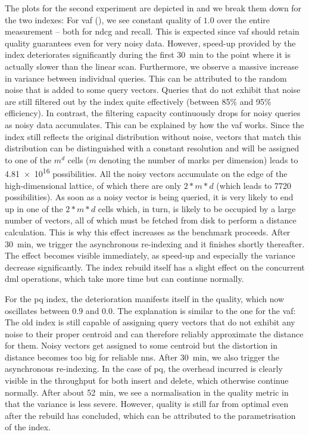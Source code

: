 The plots for the second experiment are depicted in  and we break them down for the two indexes: For \acrshort{vaf} (), we see constant quality of $1.0$ over the entire measurement -- both for \acrshort{ndcg} and recall. This is expected since \acrshort{vaf} should retain quality guarantees even for very noisy data. However, speed-up provided by the index deteriorates significantly during the first \SI{30}{\minute} to the point where it is actually slower than the linear scan. Furthermore, we observe a massive increase in variance between individual queries. This can be attributed to the random noise that is added to some query vectors. Queries that do not exhibit that noise are still filtered out by the index quite effectively (between 85\% and 95\% efficiency). In contrast, the filtering capacity continuously drops for noisy queries as noisy data accumulates. This can be explained by how the \acrshort{vaf} works. Since the index still reflects the original distribution without noise, vectors that match this distribution can be distinguished with a constant resolution and will be assigned to one of the $m^d$ cells ($m$ denoting the number of marks per dimension) leads to \SI{4.81e16}{} possibilities. All the noisy vectors accumulate on the edge of the high-dimensional lattice, of which there are only $2 * m * d$ (which leads to \SI{7720}{} possibilities). As soon as a noisy vector is being queried, it is very likely to end up in one of the $2 * m * d$ cells which, in turn, is likely to be occupied by a large number of vectors, all of which must be fetched from disk to perform a distance calculation. This is why this effect increases as the benchmark proceeds. After \SI{30}{\minute}, we trigger the asynchronous re-indexing and it finishes shortly thereafter. The effect becomes visible immediately, as speed-up and especially the variance decrease significantly. The index rebuild itself has a slight effect on the concurrent \acrshort{dml} operations, which take more time but can continue normally.

For the \acrshort{pq} index, the deterioration manifests itself in the quality, which now oscillates between $0.9$ and $0.0$. The explanation is similar to the one for the \acrshort{vaf}: The old index is still capable of assigning query vectors that do not exhibit any noise to their proper centroid and can therefore reliably approximate the distance for them. Noisy vectors get assigned to some centroid but the distortion in distance becomes too big for reliable \acrshort{nns}. After \SI{30}{\minute}, we also trigger the asynchronous re-indexing. In the case of \acrshort{pq}, the overhead incurred is clearly visible in the throughput for both insert and delete, which otherwise continue normally. After about \SI{52}{\minute}, we see a normalisation in the quality metric in that the variance is less severe. However, quality is still far from optimal even after the rebuild has concluded, which can be attributed to the parametrisation of the index.

